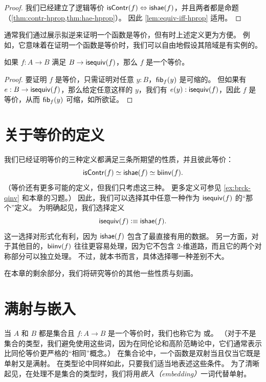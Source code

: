 \begin{proof}
  我们已经建立了逻辑等价 ${\mathsf{isContr}(f)} \Leftrightarrow {\ensuremath{\mathsf{ishae}}(f)}$，并且两者都是命题（\cref{thm:contr-hprop,thm:hae-hprop}）。
  因此 \cref{lem:equiv-iff-hprop} 适用。
\end{proof}

通常我们通过展示拟逆来证明一个函数是等价，但有时上述定义更为方便。
例如，它意味着在证明一个函数是等价时，我们可以自由地假设其陪域是有实例的。

\begin{cor}\label{thm:equiv-inhabcod}
  如果 $f:A\to B$ 满足 $B\to \mathsf{isequiv}(f)$，那么 $f$ 是一个等价。
\end{cor}

\begin{proof}
  要证明 $f$ 是等价，只需证明对任意 $y:B$，${\mathsf{fib}}_{f}(y)$ 是可缩的。
  但如果有 $e:B\to \mathsf{isequiv}(f)$，那么给定任意这样的 $y$，我们有 $e(y):\mathsf{isequiv}(f)$，因此 $f$ 是等价，从而 ${\mathsf{fib}}_{f}(y)$ 可缩，如所欲证。
\end{proof}

%
%
%

\section{关于等价的定义}
\label{sec:concluding-remarks}

我们已经证明等价的三种定义都满足三条所期望的性质，并且彼此等价：
\[ \mathsf{isContr}(f) \simeq \mathsf{ishae}(f) \simeq \mathsf{biinv}(f). \]
（等价还有更多可能的定义，但我们只考虑这三种。
更多定义可参见 \cref{ex:brck-qinv} 和本章的习题。）
因此，我们可以选择其中任意一种作为 $\mathsf{isequiv} (f)$ 的``那个''定义。
为明确起见，我们选择定义
\[ \mathsf{isequiv}(f) \vcentcolon\equiv \mathsf{ishae}(f).\]
%
这一选择对形式化有利，因为 $\mathsf{ishae}(f)$ 包含了最直接有用的数据。
另一方面，对于其他目的，$\mathsf{biinv}(f)$ 往往更容易处理，因为它不包含 $2$-维道路，而且它的两个对称部分可以独立处理。
不过，就本书而言，具体选择哪一种差别不大。

在本章的剩余部分，我们将研究等价的其他一些性质与刻画。
%

\section{满射与嵌入}
\label{sec:mono-surj}

当 $A$ 和 $B$ 都是集合且 $f:A\to B$ 是一个等价时，我们也称它为
%
或。
%
%
（对于不是集合的类型，我们避免使用这些词，因为在同伦论和高阶范畴论中，它们通常表示比同伦等价更严格的``相同''概念。）
在集合论中，一个函数是双射当且仅当它既是单射又是满射。
在类型论中同样如此，只要我们适当地表述这些条件。
为了清晰起见，在处理不是集合的类型时，我们将用\emph{嵌入（embedding）}一词代替单射。

